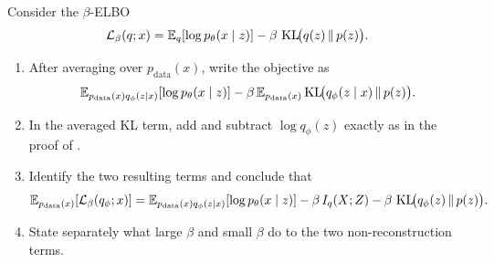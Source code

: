 \documentclass[11pt]{article}
\newif\ifshowsolutions
\newcommand{\SolutionBox}[2][10]{%
  \ifshowsolutions
    \begin{tcolorbox}[stat221panelgray,title={Solution}]
    #2
    \end{tcolorbox}
  \else
    \begin{tcolorbox}[stat221panelgray,unbreakable,title={Workspace}]
    \vspace{#1\baselineskip}
    \end{tcolorbox}
  \fi
}
\begin{document}
\begin{exercise}
\label{ex:beta-elbo}
Consider the \(\beta\)-ELBO
\[
  \mathcal{L}_\beta(q;x)
  =
  \mathbb{E}_q[\log p_\theta(x\mid z)]
  -
  \beta\,\operatorname{KL}\!\bigl(q(z)\,\|\,p(z)\bigr).
\]
\begin{enumerate}[leftmargin=*]
  \item After averaging over \(p_{\mathrm{data}}(x)\), write the objective as
  \[
    \mathbb{E}_{p_{\mathrm{data}}(x)q_\phi(z\mid x)}[\log p_\theta(x\mid z)]
    -
    \beta\,\mathbb{E}_{p_{\mathrm{data}}(x)}
    \operatorname{KL}\!\bigl(q_\phi(z\mid x)\,\|\,p(z)\bigr).
  \]
  \item In the averaged KL term, add and subtract \(\log q_\phi(z)\) exactly as in the proof of .
  \item Identify the two resulting terms and conclude that
  \[
    \E_{p_{\mathrm{data}}(x)}[\mathcal{L}_\beta(q_\phi;x)]
    =
    \E_{p_{\mathrm{data}}(x)q_\phi(z\mid x)}[\log p_\theta(x\mid z)]
    -
    \beta\,I_q(X;Z)
    -
    \beta\,\operatorname{KL}\!\bigl(q_\phi(z)\,\|\,p(z)\bigr).
  \]
  \item State separately what large \(\beta\) and small \(\beta\) do to the two non-reconstruction terms.
\end{enumerate}
\end{exercise}
\SolutionBox[10]{Apply \Cref{prop:mi-decomposition} to the averaged KL term:
\[
  \E_{p_{\mathrm{data}}(x)}
  \operatorname{KL}\!\bigl(q_\phi(z\mid x)\,\|\,p(z)\bigr)
  =
  I_q(X;Z)
  +
  \operatorname{KL}\!\bigl(q_\phi(z)\,\|\,p(z)\bigr).
\]
More explicitly,
\[
  \E\!\bigl[\log q_\phi(z\mid x)-\log p(z)\bigr]
  =
  \E\!\bigl[\log q_\phi(z\mid x)-\log q_\phi(z)\bigr]
  +
  \E\!\bigl[\log q_\phi(z)-\log p(z)\bigr],
\]
where the first expectation is \(I_q(X;Z)\) and the second is
\(\operatorname{KL}(q_\phi(z)\|p(z))\).
Substituting into the expected \(\beta\)-ELBO yields
\[
  \E_{p_{\mathrm{data}}(x)}[\mathcal{L}_\beta(q_\phi;x)]
  =
  \E_{p_{\mathrm{data}}(x)q_\phi(z\mid x)}[\log p_\theta(x\mid z)]
  -
  \beta\,I_q(X;Z)
  -
  \beta\,\operatorname{KL}\!\bigl(q_\phi(z)\,\|\,p(z)\bigr).
\]
So \(\beta\) directly rescales both parts of the KL bill.
Large \(\beta\) makes informative codes and prior mismatch expensive, which pushes toward weaker latent usage and can favor collapse.
Small \(\beta\) relaxes both penalties, so the model is more willing to store information in \(z\) and to let the aggregate posterior drift from the prior.
This changes optimization pressure, but it does not enlarge the family \(q_\phi(z\mid x)\), so it does not remove the underlying geometric mismatch.}
\end{document}
